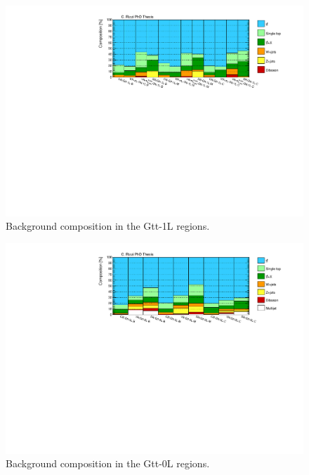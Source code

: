 
\begin{figure}[htbp]
\includegraphics[width=\textwidth]{figures/Chap8/Rizzi-Fig8-10-1.pdf}
\caption{Background composition in the Gtt-1L regions.}
	\label{fig:bkgcomp_Gtt1L}
\end{figure}

\begin{figure}[htbp]
\includegraphics[width=\textwidth]{figures/Chap8/Rizzi-Fig8-11.pdf}
\caption{Background composition in the Gtt-0L regions.}
	\label{fig:bkgcomp_Gtt0L}
\end{figure}

